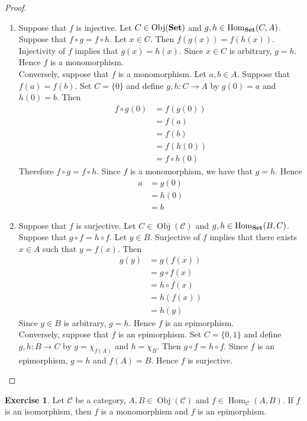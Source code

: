 \documentclass{book}
\theoremstyle{definition}
\newtheorem{ex}[definition]{Exercise}
\newcommand{\MC}{\mathcal{C}}
\newcommand{\lex}[1]{\label{ex:#1}}
\DeclareMathOperator{\Obj}{Obj}
\DeclareMathOperator{\Hom}{Hom}
\DeclareMathOperator*{\Set}{\text{\tbf{Set}}}
\DeclareMathOperator*{\0}{\mbf{0}}
\DeclareMathOperator*{\1}{\mbf{1}}
\newcommand{\tbf}[1]{\textbf{#1}}
\begin{document}
	\begin{proof}\
		\begin{enumerate}
			\item Suppose that $f$ is injective. Let $C \in \Obj(\Set)$ and $g,h \in \Hom_{\Set}(C, A)$. Suppose that $f \circ g = f \circ h$. Let $x \in C$. Then $f(g(x)) = f(h(x))$. Injectivity of $f$ implies that $g(x) = h(x)$. Since $x \in C$ is arbitrary, $g = h$. Hence $f$ is a monomorphism. \\
			Conversely, suppose that $f$ is a monomorphism. Let $a, b \in A$. Suppose that $f(a) = f(b)$. Set $C = \{0\}$ and define $g,h: C \rightarrow A$ by $g(0) = a$ and $h(0) = b$. Then  
			\begin{align*}
				f \circ g(0) 
				& = f(g(0)) \\
				& = f(a) \\
				& = f(b) \\
				& = f(h(0)) \\
				& = f \circ h(0) 
			\end{align*}
			Therefore $f \circ g = f \circ h$. Since $f$ is a monomorphism, we have that $g = h$. Hence 
			\begin{align*}
				a 
				& = g(0) \\
				& = h(0) \\
				& = b
			\end{align*}
			\item Suppose that $f$ is surjective. Let $C \in \Obj(\MC)$ and $g,h \in \Hom_{\Set}(B, C)$. Suppose that $g \circ f = h \circ f$. Let $y \in B$. Surjective of $f$ implies that there exists $x \in A$ such that $y = f(x)$. 
			Then 
			\begin{align*}
				g(y)
				& = g(f(x)) \\
				& = g \circ f (x) \\
				& = h \circ f (x) \\
				& = h(f(x)) \\
				& = h(y) 
			\end{align*}
			Since $y \in B$ is arbitrary, $g = h$. Hence $f$ is an epimorphism. \\
			Conversely, suppose that $f$ is an epimorphism. Set $C = \{0,1\}$ and define $g, h: B \rightarrow C$ by $g = \chi_{f(A)}$ and $h = \chi_{B}$. Then $g \circ f = h \circ f$. Since $f$ is an epimorphism, $g = h$ and $f(A) = B$. Hence $f$ is surjective.  
		\end{enumerate}
	\end{proof}
	
	\begin{ex} \lex{15011}
		Let $\MC$ be a category, $A,B \in \Obj(\MC)$ and $f \in \Hom_{\MC}(A, B)$. If $f$ is an isomorphism, then $f$ is a monomorphism and $f$ is an epimorphism. 
	\end{ex}
	
\end{document}

